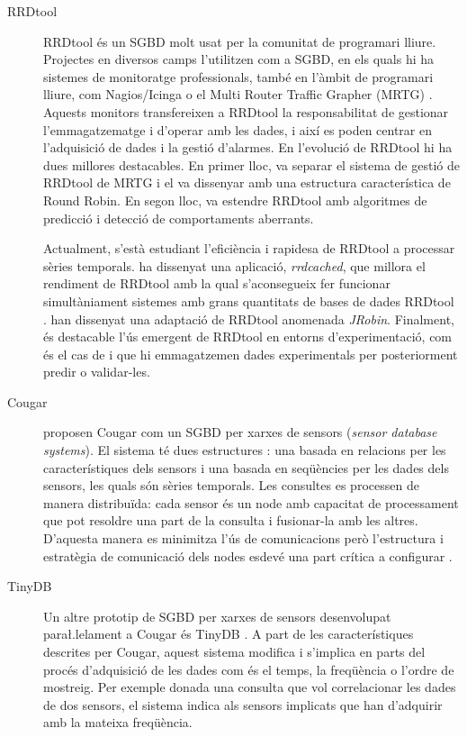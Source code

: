 \begin{description}
\item[RRDtool]
RRDtool \parencite{rrdtool} {é}s un SGBD molt usat per la comunitat de programari lliure. Projectes en diversos camps l'utilitzen com a SGBD, en els quals hi ha sistemes de monitoratge professionals, també en l'àmbit de programari lliure, com Nagios/Icinga \parencite{nagios,icinga} o el Multi Router Traffic Grapher (MRTG) \parencite{mrtg}. Aquests monitors transfereixen a RRDtool la responsabilitat de gestionar l'emmagatzematge i d'operar amb les dades, i així es poden centrar en l'adquisició de dades i la gestió d'alarmes. 
En l'evolució de RRDtool hi ha dues millores destacables. En primer lloc, \textcite{lisa98:oetiker} va separar el sistema de gestió de RRDtool de MRTG i el va dissenyar amb una estructura característica de Round Robin. En segon lloc,  \textcite{lisa00:brutlag} va estendre RRDtool amb algoritmes de predicció i detecció de comportaments aberrants. 

Actualment, s'està estudiant l'eficiència i rapidesa de RRDtool a processar sèries temporals. \textcite{carder:rrdcached} ha dissenyat una aplicació, \emph{rrdcached}, que millora el rendiment de RRDtool amb la qual s'aconsegueix fer funcionar  simultàniament sistemes amb grans quantitats de bases de dades RRDtool \parencite{lisa07:plonka}. \textcite{jrobin} han dissenyat una adaptació de RRDtool anomenada \emph{JRobin}. 
Finalment, és destacable l'ús emergent de RRDtool en entorns d'experimentació, com és el cas de \textcite{zhang07} i \textcite{chilingaryan10} que hi emmagatzemen dades experimentals per posteriorment predir o validar-les.


\item[Cougar]
\textcite{cougar,fung02} proposen Cougar com un SGBD per xarxes de sensors (\emph{sensor database systems}). El sistema té dues estructures \parencite{bonnet01}: una basada en relacions per les característiques dels sensors i una basada en seqüències per les dades dels sensors, les quals són sèries temporals.
Les consultes es processen de manera distribuïda: cada sensor és un node amb capacitat de processament que pot resoldre una part de la consulta i fusionar-la amb les altres. D'aquesta manera es minimitza l'ús de comunicacions però l'estructura i estratègia de comunicació dels nodes esdevé una part crítica a configurar \parencite{demers03}.

\item[TinyDB]
Un altre prototip de SGBD per xarxes de sensors desenvolupat para\l.lelament a Cougar és TinyDB \parencite{tinyDB,madden05}. A part de les característiques descrites per Cougar, aquest sistema  modifica i s'implica en parts del procés d'adquisició de les dades com és el temps, la freqüència o l'ordre de mostreig. Per exemple donada una consulta que vol correlacionar les dades de dos sensors, el sistema indica als sensors implicats que han d'adquirir amb la mateixa freqüència.


\end{description}
